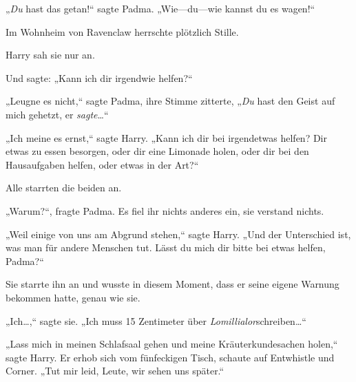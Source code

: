 „\emph{Du} hast das getan!“ sagte Padma. „Wie—du—wie kannst du es wagen!“

Im Wohnheim von Ravenclaw herrschte plötzlich Stille.

Harry sah sie nur an.

Und sagte: „Kann ich dir irgendwie helfen?“

„Leugne es nicht,“ sagte Padma, ihre Stimme zitterte, „\emph{Du} hast den Geist auf mich gehetzt, er \emph{sagte}…“

„Ich meine es ernst,“ sagte Harry. „Kann ich dir bei irgendetwas helfen? Dir etwas zu essen besorgen, oder dir eine Limonade holen, oder dir bei den Hausaufgaben helfen, oder etwas in der Art?“

Alle starrten die beiden an.

„Warum?“, fragte Padma. Es fiel ihr nichts anderes ein, sie verstand nichts.

„Weil einige von uns am Abgrund stehen,“ sagte Harry. „Und der Unterschied ist, was man für andere Menschen tut. Lässt du mich dir bitte bei etwas helfen, Padma?“

Sie starrte ihn an und wusste in diesem Moment, dass er seine eigene Warnung bekommen hatte, genau wie sie.

„Ich…,“ sagte sie. „Ich muss 15 Zentimeter über \emph{Lomillialor}schreiben…“

„Lass mich in meinen Schlafsaal gehen und meine Kräuterkundesachen holen,“ sagte Harry. Er erhob sich vom fünfeckigen Tisch, schaute auf Entwhistle und Corner. „Tut mir leid, Leute, wir sehen uns später.“

